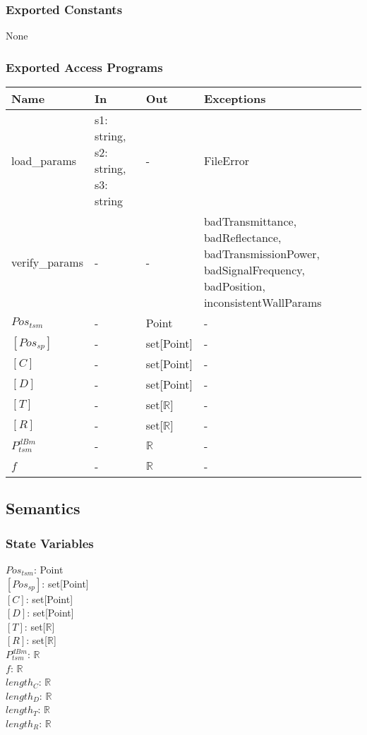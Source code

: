 \documentclass[12pt, titlepage]{article}
\begin{document}
\subsubsection{Exported Constants}

None

\subsubsection{Exported Access Programs}

\begin{center}
\begin{tabular}{p{4cm} p{2cm} p{2cm} p{4cm}}
\hline
\textbf{Name} & \textbf{In} & \textbf{Out} & \textbf{Exceptions} \\
\hline
load\_params & s1: string, s2: string, s3: string & - & FileError \\
verify\_params & - & - & badTransmittance, badReflectance, badTransmissionPower, badSignalFrequency, badPosition, inconsistentWallParams \\
$Pos_{tsm}$ & - & Point & - \\
$[Pos_{sp}]$ & - & set[Point] & - \\
$[C]$ & - & set[Point] & - \\
$[D]$ & - & set[Point] & - \\
$[T]$ & - & set[$\mathbb{R}$] & - \\
$[R]$ & - & set[$\mathbb{R}$] & - \\
$P_{tsm}^{dBm}$ & - & $\mathbb{R}$ & - \\
$f$ & - & $\mathbb{R}$ & - \\
\hline
\end{tabular}
\end{center}

\subsection{Semantics}

\subsubsection{State Variables}
$Pos_{tsm}$: Point\\
$[Pos_{sp}]$: set[Point]\\
$[C]$: set[Point]\\
$[D]$: set[Point]\\
$[T]$: set[$\mathbb{R}$]\\
$[R]$: set[$\mathbb{R}$]\\
$P_{tsm}^{dBm}$: $\mathbb{R}$\\
$f$: $\mathbb{R}$\\
$length_C$: $\mathbb{R}$\\
$length_D$: $\mathbb{R}$\\
$length_T$: $\mathbb{R}$\\
$length_R$: $\mathbb{R}$\\
\end{document}

